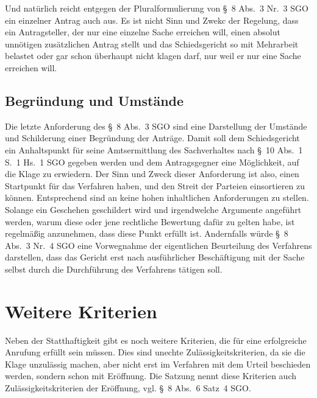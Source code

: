 Und natürlich reicht entgegen der Pluralformulierung von \S~8 Abs.~3 Nr.~3 SGO ein einzelner Antrag auch aus. Es ist nicht Sinn und Zwekc der Regelung, dass ein Antragsteller, der nur eine einzelne Sache erreichen will, einen absolut unnötigen zusätzlichen Antrag stellt und das Schiedsgericht so mit Mehrarbeit belastet oder gar schon überhaupt nicht klagen darf, nur weil er nur eine Sache erreichen will.

\subsection{Begründung und Umstände}
\label{Standardworkflow:Gruende}
Die letzte Anforderung des \S~8 Abs.~3 SGO sind eine Darstellung der Umstände und Schilderung einer Begründung der Anträge.
Damit soll dem Schiedsgericht ein Anhaltspunkt für seine Amtsermittlung des Sachverhaltes nach \S~10 Abs.~1 S.~1 Hs.~1 SGO gegeben werden und dem Antragsgegner eine Möglichkeit, auf die Klage zu erwiedern.
Der Sinn und Zweck dieser Anforderung ist also, einen Startpunkt für das Verfahren haben, und den Streit der Parteien einsortieren zu können.
Entsprechend sind an keine hohen inhaltlichen Anforderungen zu stellen.
Solange ein Geschehen geschildert wird und irgendwelche Argumente angeführt werden, warum diese oder jene rechtliche Bewertung dafür zu gelten habe, ist regelmäßig anzunehmen, dass diese Punkt erfüllt ist.
Andernfalls würde \S~8 Abs.~3 Nr.~4 SGO eine Vorwegnahme der eigentlichen Beurteilung des Verfahrens darstellen, dass das Gericht erst nach ausführlicher Beschäftigung mit der Sache selbst durch die Durchführung des Verfahrens tätigen soll.

\section{Weitere Kriterien}
\label{Standardworkflow:Kriterien}
Neben der Statthaftigkeit gibt es noch weitere Kriterien, die für eine erfolgreiche Anrufung erfüllt sein müssen.
Dies sind unechte Zulässigkeitskriterien, da sie die Klage unzulässig machen, aber nicht erst im Verfahren mit dem Urteil beschieden werden, sondern schon mit Eröffnung.
Die Satzung nennt diese Kriterien auch Zulässigkeitskriterien der Eröffnung, vgl. \S~8 Abs.~6 Satz~4 SGO.

